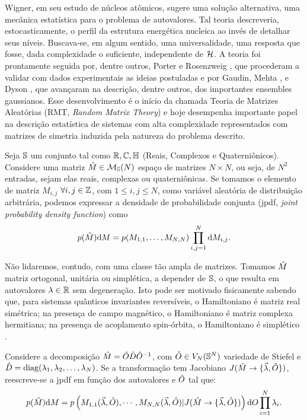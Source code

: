 \documentclass[12pt]{report}
\begin{document}
Wigner, em seu estudo de núcleos atômicos, sugere uma solução alternativa, uma mecânica estatística para o problema de autovalores. Tal teoria descreveria, estocasticamente, o perfil da estrutura energética nucleica ao invés de detalhar seus níveis. Buscava-se, em algum sentido, uma universalidade, uma resposta que fosse, dada complexidade o suficiente, independente de $\operatorname{\mathcal{H}}$. A teoria foi prontamente seguida por, dentre outros, Porter e Rosenzweig \cite{PoterRosen}, que procederam a validar com dados experimentais as ideias postuladas e por Gaudin, Mehta \cite{MehtaGaudin}, e Dyson \cite{Dyson}, que avançaram na descrição, dentre outros, dos importantes ensembles gaussianos. Esse desenvolvimento é o início da chamada Teoria de Matrizes Aleatórias (RMT, \textit{Random Matrix Theory}) e hoje desempenha importante papel na descrição estatística de sistemas com alta complexidade representados com matrizes de simetria induzida pela natureza do problema descrito.

Seja $\mathbb{S}$ um conjunto tal como $\mathbb{R}, \mathbb{C}, \mathbb{H} $ (Reais, Complexos e Quaterniônicos). Considere uma matriz $\hat M \in \mathcal{M}_{\mathbb{S}}(N)$ espaço de matrizes $N \times N$, ou seja, de $N^2$ entradas, sejam elas reais, complexas ou quaterniônicas. Se tomamos o elemento de matriz $M_{i,j}$ $\forall i, j \in \mathbb{Z}$, com $1 \leq i, j \leq N$, como variável aleatória de distribuição arbitrária, podemos expressar a densidade de probabilidade conjunta (jpdf, \textit{joint probability density function}) como $$p(\hat{M}) \mathrm{d} M = p(M_{1,1}, \dots, M_{N,N}) \prod_{i,j=1}^{N} \mathrm{d} M_{i,j}.$$

Não lidaremos, contudo, com uma classe tão ampla de matrizes. Tomamos $\hat M$ matriz ortogonal, unitária ou simplética, a depender de $\mathbb{S}$, o que resulta em autovalores $\lambda \in \mathbb{R}$ sem degeneração. Isto pode ser motivado fisicamente sabendo que, para sistemas quânticos invariantes reversíveis, o Hamiltoniano é matriz real simétrica; na presença de campo magnético, o Hamiltoniano é matriz complexa hermitiana; na presença de acoplamento spin-órbita, o Hamiltoniano é simplético \cite[Capítulo~2]{RMT-firstcourse-Potters}. 

Considere a decomposição $\hat M = \hat O \hat D \hat O^{-1}$, com $\hat O \in V_N(\mathbb{S}^N)$ variedade de Stiefel e $\hat D = \operatorname{diag}(\lambda_1, \lambda_2, \dots, \lambda_N)$. Se a transformação tem Jacobiano $J(\hat M \rightarrow \{ \vec{\lambda}, \hat O \} )$, reescreve-se a jpdf em função dos autovalores e $\hat O$ tal que:
\begin{equation}
	p(\hat{M}) \mathrm{d} M = p \left( M_{1,1}(\vec{\lambda}, \hat O), \cdots, M_{N,N}(\vec{\lambda}, \hat O) | J(\hat M \rightarrow \{ \vec{\lambda}, \hat O \} ) \right) \mathrm{d} O \prod_{i=1}^{N} \lambda_i.
	\label{Equation: p(lambda, O)}
\end{equation}
\end{document}
